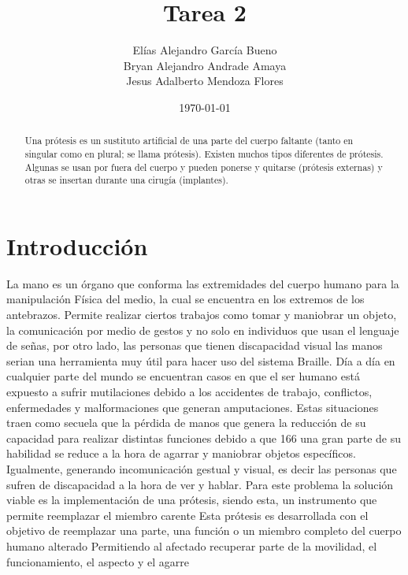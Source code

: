 \documentclass{article}
\author{Elías Alejandro García Bueno \\
Bryan Alejandro Andrade Amaya \\ Jesus Adalberto Mendoza Flores} %
\title{Tarea 2} %
\date{\today}
\begin{document}

\maketitle %

\begin{abstract} %
Una prótesis es un sustituto artificial de una parte del cuerpo faltante (tanto en singular como en plural; se llama prótesis).
Existen muchos tipos diferentes de prótesis. Algunas se usan por fuera del cuerpo y pueden ponerse y quitarse (prótesis externas) y otras se insertan durante una cirugía (implantes).
\end{abstract}

\section{Introducción}\label{intro} %

La mano es un órgano que conforma las extremidades del cuerpo humano para la manipulación Física del medio, la cual se encuentra en los extremos de los antebrazos. Permite realizar ciertos trabajos como tomar y maniobrar un objeto, la comunicación por medio de gestos y no solo en individuos que usan el lenguaje de señas, por otro lado, las personas que tienen discapacidad visual las manos serian una herramienta muy útil para hacer uso del sistema Braille.
Día a día en cualquier parte del mundo se encuentran casos en que el ser humano está expuesto a sufrir mutilaciones debido a los accidentes de trabajo, conflictos, enfermedades y malformaciones que generan amputaciones.  Estas situaciones traen como secuela que la pérdida de manos que genera la reducción de su capacidad para realizar distintas funciones debido a que 166 una gran parte de su habilidad se reduce a la hora de agarrar y maniobrar objetos específicos. Igualmente, generando incomunicación gestual y visual, es decir las personas que sufren de discapacidad a la hora de ver y hablar. Para este problema la solución viable es la implementación de una prótesis, siendo esta, un instrumento que permite reemplazar el miembro carente  Esta prótesis es desarrollada con el objetivo de reemplazar  una  parte, una  función  o  un  miembro completo del cuerpo humano alterado  Permitiendo al afectado   recuperar   parte de la movilidad, el funcionamiento, el aspecto y el agarre




\end{document}
